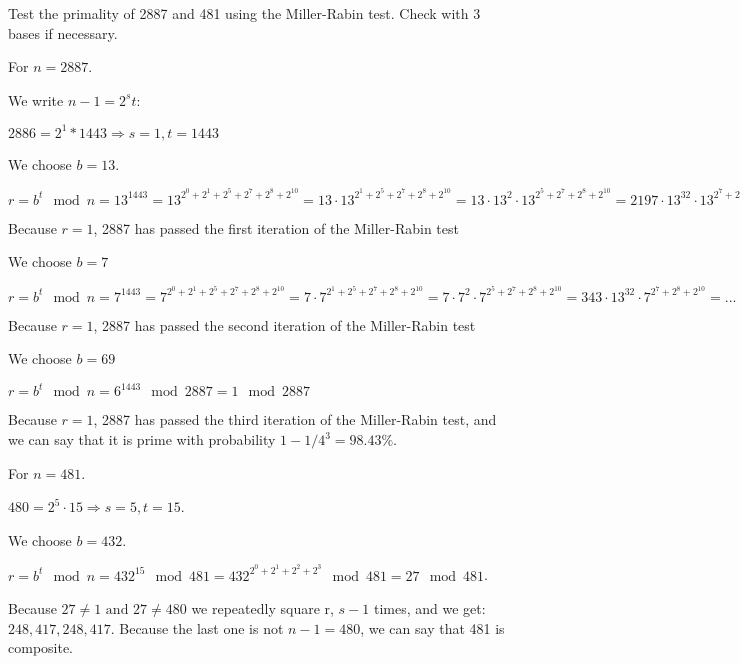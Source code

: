 \documentclass[a4paper,12pt]{article}
\author{Roland Szabo, gr. 235}
\begin{document}
Test the primality of 2887 and 481 using the Miller-Rabin test. Check with 3 bases if necessary. 

For $ n = 2887 $.

We write $ n - 1 = 2^s t $:

$ 2886 = 2^1 * 1443 \Rightarrow s = 1, t = 1443 $

We choose $ b = 13 $.

$ r = b^t \mod n = 13^1443 = 13^{2^0 + 2^1 + 2^5 + 2^7 + 2^8 + 2^10} = 13 \cdot 13^{2^1 + 2^5 + 2^7 + 2^8 + 2^10} = 13 \cdot 13^2 \cdot 13^{2^5 + 2^7 + 2^8 + 2^10} = 2197 \cdot 13^32 \cdot 13^{2^7 + 2^8 + 2^10} = 1422 \cdot 1422^4 \cdot 1422^8 \cdot 13^1023 = 1 $

Because $ r = 1 $, 2887 has passed the first iteration of the Miller-Rabin test

We choose $ b = 7 $

$ r = b^t \mod n = 7^1443 = 7^{2^0 + 2^1 + 2^5 + 2^7 + 2^8 + 2^10} = 7 \cdot 7^{2^1 + 2^5 + 2^7 + 2^8 + 2^10} = 7 \cdot 7^2 \cdot 7^{2^5 + 2^7 + 2^8 + 2^10} = 343 \cdot 13^32 \cdot 7^{2^7 + 2^8 + 2^10} = ... = 1 \mod 2887$

Because $ r = 1 $, 2887 has passed the second iteration of the Miller-Rabin test

We choose $ b = 69 $

$ r = b^t \mod n = 6^1443 \mod 2887 = 1 \mod 2887$

Because $ r = 1 $, 2887 has passed the third iteration of the Miller-Rabin test, and we can say that it is prime with probability $ 1 - 1/4^3 = 98.43 \%$.

For $ n =  481 $.

$ 480 = 2^5 \cdot 15 \Rightarrow s = 5, t = 15 $. 

We choose $ b = 432 $.

$ r = b^t \mod n = 432^15 \mod 481 = 432^{2^0 + 2^1 + 2^2 + 2^3} \mod 481 = 27 \mod 481 $. 

Because $ 27 \neq 1 \text{ and } 27 \neq 480 $ we repeatedly square r, $ s - 1 $ times, and we get: $ 248, 417, 248, 417 $. Because the last one is not $ n-1 = 480 $, we can say that 481 is composite. 
\end{document}
